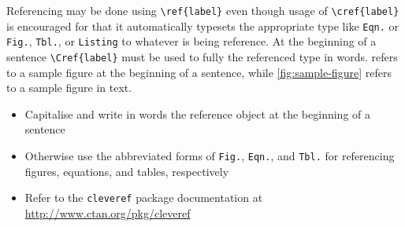 \documentclass[%
    thesis=ma, %
    language=american, %
    paper=a4,%
    listings,
    online,
    final,
]{isw}
\begin{document}
    Referencing may be done using \verb|\ref{label}| even though usage of \verb|\cref{label}| is encouraged for that it automatically typesets the appropriate type like \texttt{Eqn.} or \texttt{Fig.}, \texttt{Tbl.}, or \texttt{Listing} to whatever is being reference. At the beginning of a sentence \verb|\Cref{label}| must be used to fully the referenced type in words.  refers to a sample figure at the beginning of a sentence, while \cref{fig:sample-figure} refers to a sample figure in text.
    
    \begin{itemize}
        \item Capitalise and write in words the reference object at the beginning of a sentence
        \item Otherwise use the abbreviated forms of \texttt{Fig.}, \texttt{Eqn.}, and \texttt{Tbl.} for referencing figures, equations, and tables, respectively
        \item Refer to the \verb|cleveref| package documentation at \url {http://www.ctan.org/pkg/cleveref}
    \end{itemize}
    
\end{document}
